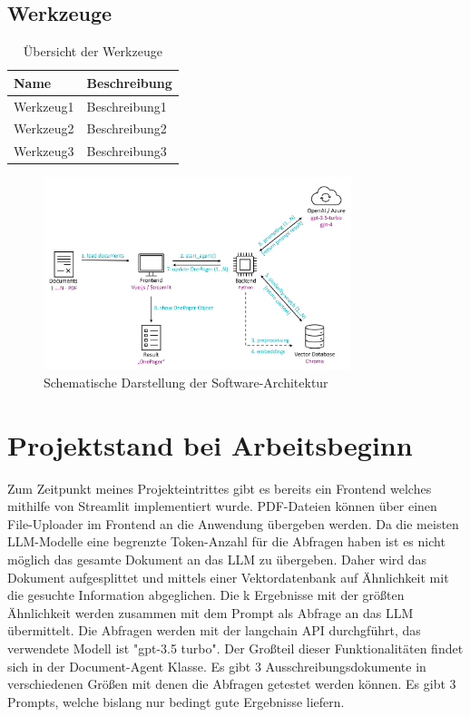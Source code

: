 \subsection{Werkzeuge}

\begin{table}[H]
    \centering
    \caption{Übersicht der Werkzeuge}
    \label{tab:werkzeuge}
    \begin{tabular}{|l|l|}
    \hline
    \textbf{Name} & \textbf{Beschreibung} \\ \hline
    Werkzeug1 & Beschreibung1 \\ \hline
    Werkzeug2 & Beschreibung2 \\ \hline
    Werkzeug3 & Beschreibung3 \\ \hline
    \end{tabular}
\end{table}



\begin{figure}[ht]
    \centering
    \includegraphics[width=0.8\textwidth]{figures/DokumentenAgent-Uebersicht.png}
    \caption{Schematische Darstellung der Software-Architektur}
    \label{fig:DokumentenAgent-uebersicht}    %
\end{figure}


\section{Projektstand bei Arbeitsbeginn}
Zum Zeitpunkt meines Projekteintrittes gibt es bereits ein Frontend welches mithilfe von Streamlit implementiert wurde. 
PDF-Dateien können über einen File-Uploader im Frontend an die Anwendung übergeben werden. Da die meisten LLM-Modelle eine 
begrenzte Token-Anzahl für die Abfragen haben ist es nicht möglich das gesamte Dokument an das LLM zu übergeben. 
Daher wird das Dokument aufgesplittet und mittels einer Vektordatenbank auf Ähnlichkeit mit die gesuchte Information 
abgeglichen. Die k Ergebnisse mit der größten Ähnlichkeit werden zusammen mit dem Prompt als Abfrage an das LLM übermittelt. 
Die Abfragen werden mit der langchain API durchgführt, das verwendete Modell ist "gpt-3.5 turbo". 
Der Großteil dieser Funktionalitäten findet sich in der Document-Agent Klasse. Es gibt 3 Ausschreibungsdokumente in 
verschiedenen Größen mit denen die Abfragen getestet werden können. Es gibt 3 Prompts, welche bislang nur bedingt gute 
Ergebnisse liefern.

